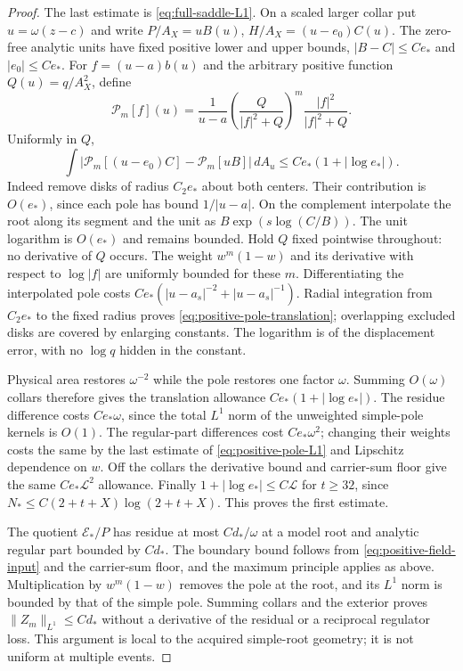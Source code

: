 \begin{proof}
The last estimate is \eqref{eq:full-saddle-L1}.
On a scaled larger collar put $u=\omega(z-c)$ and write
$P/A_X=uB(u)$, $H/A_X=(u-e_0)C(u)$.
The zero-free analytic units have fixed positive lower and upper
bounds, $|B-C|\le Ce_*$ and $|e_0|\le Ce_*$.
For $f=(u-a)b(u)$ and the arbitrary positive function
$Q(u)=q/A_X^2$, define
\begin{equation}
 \mathcal P_m[f](u)=\frac1{u-a}
  \left(\frac{Q}{|f|^2+Q}\right)^m
  \frac{|f|^2}{|f|^2+Q}.
 \label{eq:positive-scaled-pole}
\end{equation}
Uniformly in $Q$,
\begin{equation}
 \int|\mathcal P_m[(u-e_0)C]-\mathcal P_m[uB]|\,dA_u
 \le Ce_*(1+|\log e_*|).
 \label{eq:positive-pole-translation}
\end{equation}
Indeed remove disks of radius $C_2e_*$ about both centers. Their
contribution is $O(e_*)$, since each pole has bound $1/|u-a|$.
On the complement interpolate the root along its segment and the unit
as $B\exp(s\log(C/B))$. The unit logarithm is $O(e_*)$ and remains
bounded. Hold $Q$ fixed pointwise throughout: no derivative of $Q$
occurs. The weight $w^m(1-w)$ and its derivative with respect to
$\log|f|$ are uniformly bounded for these $m$. Differentiating the
interpolated pole costs
$Ce_*(|u-a_s|^{-2}+|u-a_s|^{-1})$.
Radial integration from $C_2e_*$ to the fixed radius proves
\eqref{eq:positive-pole-translation}; overlapping excluded disks are
covered by enlarging constants. The logarithm is of the displacement
error, with no $\log q$ hidden in the constant.

Physical area restores $\omega^{-2}$ while the pole restores one
factor $\omega$. Summing $O(\omega)$ collars therefore gives the
translation allowance $Ce_*(1+|\log e_*|)$.
The residue difference costs $Ce_*\omega$, since the total $L^1$
norm of the unweighted simple-pole kernels is $O(1)$.
The regular-part differences cost $Ce_*\omega^2$; changing their
weights costs the same by the last estimate of
\eqref{eq:positive-pole-L1} and Lipschitz dependence on $w$.
Off the collars the derivative bound and carrier-sum floor give the
same $Ce_*\mathcal L^2$ allowance. Finally
$1+|\log e_*|\le C\mathcal L$ for $t\ge32$, since
$N_*\le C(2+t+X)\log(2+t+X)$. This proves the first estimate.

The quotient $\mathcal E_*/P$ has residue at most $Cd_*/\omega$
at a model root and analytic regular part bounded by $Cd_*$.
The boundary bound follows from \eqref{eq:positive-field-input} and
the carrier-sum floor, and the maximum principle applies as above.
Multiplication by $w^m(1-w)$ removes the pole at the root, and its
$L^1$ norm is bounded by that of the simple pole. Summing collars and
the exterior proves $\|Z_m\|_{L^1}\le Cd_*$ without a derivative of
the residual or a reciprocal regulator loss. This argument is local to
the acquired simple-root geometry; it is not uniform at multiple events.
\end{proof}

